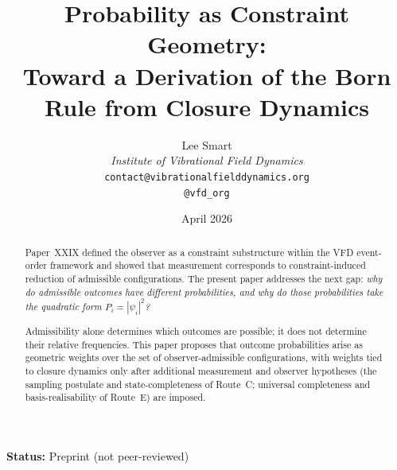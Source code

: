 \documentclass[12pt]{article}
\title{Probability as Constraint Geometry:\\[6pt]
\large Toward a Derivation of the Born Rule from Closure Dynamics}
\author{%
  Lee Smart\\[4pt]
  \textit{Institute of Vibrational Field Dynamics}\\[2pt]
  \texttt{contact@vibrationalfielddynamics.org}\\[2pt]
  \texttt{@vfd\_org}%
}
\date{April 2026}
\begin{document}
\maketitle

\noindent\textbf{Status:} Preprint (not peer-reviewed)

\begin{abstract}
Paper~XXIX defined the observer as a constraint substructure within the VFD event-order framework and showed that measurement corresponds to constraint-induced reduction of admissible configurations. The present paper addresses the next gap: \textit{why do admissible outcomes have different probabilities, and why do those probabilities take the quadratic form $P_i = |\psi_i|^2$?}

Admissibility alone determines which outcomes are possible; it does not determine their relative frequencies. This paper proposes that outcome probabilities arise as geometric weights over the set of observer-admissible configurations, with weights tied to closure dynamics only after additional measurement and observer hypotheses (the sampling postulate and state-completeness of Route~C; universal completeness and basis-realisability of Route~E) are imposed.


\end{abstract}
\end{document}
